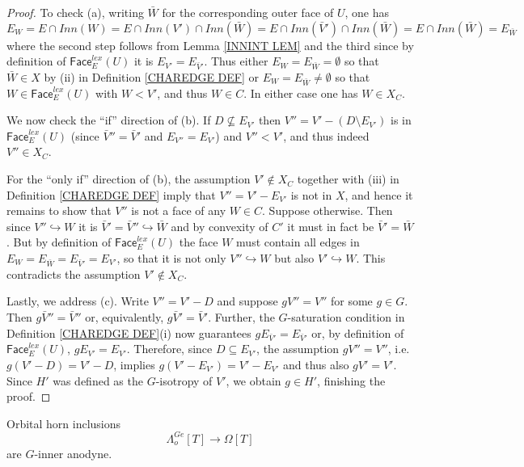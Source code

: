 \documentclass[a4paper,10pt,draft]{article}%
\numberwithin{equation}{section}%
\numberwithin{figure}{section}
\begin{document}
\begin{proof}
To check (a), writing $\bar{W}$ for the corresponding outer face of $U$, one has
	\[
	E_W = E \cap Inn (W) = E \cap Inn(V') \cap Inn(\bar{W})
	= E \cap Inn(\bar{V}') \cap Inn(\bar{W})
	= E \cap Inn(\bar{W}) = E_{\bar{W}}
	\]
where the second step follows from Lemma \ref{INNINT LEM}
and the third since by definition of
$\mathsf{Face}_{E}^{lex}(U)$ it is $E_{V'} = E_{\bar{V}'}$.
Thus either $E_W = E_{\bar{W}} = \emptyset$ so that $\bar{W}\in X$
by (ii) in Definition \ref{CHAREDGE DEF}
or $E_W = E_{\bar{W}} \neq \emptyset$
so that $W \in \mathsf{Face}_E^{lex}(U)$ with $W<V'$, and thus $W\in C$. In either case one has $W \in X_C$.

We now check the ``if'' direction of (b).
If $D \not \subseteq E_{V'}$
then $V'' = V' - (D \setminus E_{V'})$
is in $\mathsf{Face}_{E}^{lex}(U)$
(since $\bar{V}'' = \bar{V}'$ and $E_{V''}=E_{V'}$)
and $V''<V'$, and thus indeed $V'' \in X_C$.

For the ``only if'' direction of (b), the assumption $V' \not \in X_C$ together with (iii) in Definition \ref{CHAREDGE DEF} imply that
$V''=V'-E_{V'}$ is not in $X$, and hence it remains to show that 
$V''$ is not a face of any $W \in C$. Suppose otherwise.
Then since $V'' \hookrightarrow W$ it is $ \bar{V}' = \bar{V}'' \hookrightarrow \bar{W}$
and by convexity of $C'$ it must in fact be 
$ \bar{V}' = \bar{W}$. But by definition of $\mathsf{Face}_{E}^{lex}(U)$ the face $W$ must contain all edges in 
$E_W=E_{\bar{W}} = E_{\bar{V}'} = E_{V'}$,
so that it is not only $V'' \hookrightarrow W$ but also
$V' \hookrightarrow W$. This contradicts the assumption $V' \not \in X_C$.

Lastly, we address (c). Write $V''=V'-D$ and suppose $gV'' = V''$ for some $g \in G$.
Then $g\bar{V}'' = \bar{V}''$ or, equivalently, 
$g\bar{V}' = \bar{V}'$.
Further, the $G$-saturation condition in 
Definition \ref{CHAREDGE DEF}(i)
now guarantees $g E_{\bar{V}'} = E_{\bar{V}'}$ or, by definition of $\mathsf{Face}_E^{lex}(U)$, 
$g E_{V'} = E_{V'}$. 
Therefore, since $D \subseteq E_{V'}$,
the assumption $gV'' = V''$, i.e.
$g(V'-D) = V'-D$,
implies 
$g(V'-E_{V'}) = V'-E_{V'}$
and thus also $g V' = V'$. 
Since $H'$ was defined as the $G$-isotropy of $V'$,
we obtain $g \in H'$, finishing the proof.
\end{proof}


\begin{proposition}
Orbital horn inclusions
\[
	\Lambda_o^{Ge}[T] \to \Omega[T]
\]
are $G$-inner anodyne.
\end{proposition}
\end{document}
